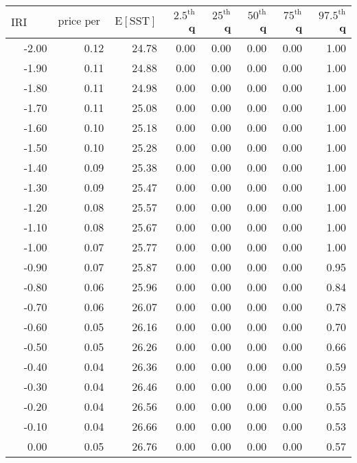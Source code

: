 \begin{table*}[ht]
\centering \footnotesize
\begin{tabular}{rrrrrrrr}
  \hline
$\mbox{IRI anom}$ & $\mbox{price per USD}$ & $\mbox{E}[\mbox{SST}]$ & $2.5^{\mbox{th}}$ q & $25^{\mbox{th}}$ q & $50^{\mbox{th}}$ q & $75^{\mbox{th}}$ q & $97.5^{\mbox{th}}$ q \\ 
  \hline
-2.00 & 0.12 & 24.78 & 0.00 & 0.00 & 0.00 & 0.00 & 1.00 \\ 
  -1.90 & 0.11 & 24.88 & 0.00 & 0.00 & 0.00 & 0.00 & 1.00 \\ 
  -1.80 & 0.11 & 24.98 & 0.00 & 0.00 & 0.00 & 0.00 & 1.00 \\ 
  -1.70 & 0.11 & 25.08 & 0.00 & 0.00 & 0.00 & 0.00 & 1.00 \\ 
  -1.60 & 0.10 & 25.18 & 0.00 & 0.00 & 0.00 & 0.00 & 1.00 \\ 
  -1.50 & 0.10 & 25.28 & 0.00 & 0.00 & 0.00 & 0.00 & 1.00 \\ 
  -1.40 & 0.09 & 25.38 & 0.00 & 0.00 & 0.00 & 0.00 & 1.00 \\ 
  -1.30 & 0.09 & 25.47 & 0.00 & 0.00 & 0.00 & 0.00 & 1.00 \\ 
  -1.20 & 0.08 & 25.57 & 0.00 & 0.00 & 0.00 & 0.00 & 1.00 \\ 
  -1.10 & 0.08 & 25.67 & 0.00 & 0.00 & 0.00 & 0.00 & 1.00 \\ 
  -1.00 & 0.07 & 25.77 & 0.00 & 0.00 & 0.00 & 0.00 & 1.00 \\ 
  -0.90 & 0.07 & 25.87 & 0.00 & 0.00 & 0.00 & 0.00 & 0.95 \\ 
  -0.80 & 0.06 & 25.96 & 0.00 & 0.00 & 0.00 & 0.00 & 0.84 \\ 
  -0.70 & 0.06 & 26.07 & 0.00 & 0.00 & 0.00 & 0.00 & 0.78 \\ 
  -0.60 & 0.05 & 26.16 & 0.00 & 0.00 & 0.00 & 0.00 & 0.70 \\ 
  -0.50 & 0.05 & 26.26 & 0.00 & 0.00 & 0.00 & 0.00 & 0.66 \\ 
  -0.40 & 0.04 & 26.36 & 0.00 & 0.00 & 0.00 & 0.00 & 0.59 \\ 
  -0.30 & 0.04 & 26.46 & 0.00 & 0.00 & 0.00 & 0.00 & 0.55 \\ 
  -0.20 & 0.04 & 26.56 & 0.00 & 0.00 & 0.00 & 0.00 & 0.55 \\ 
  -0.10 & 0.04 & 26.66 & 0.00 & 0.00 & 0.00 & 0.00 & 0.53 \\ 
  0.00 & 0.05 & 26.76 & 0.00 & 0.00 & 0.00 & 0.00 & 0.57 \\ 

\end{tabular}
\end{table*}
